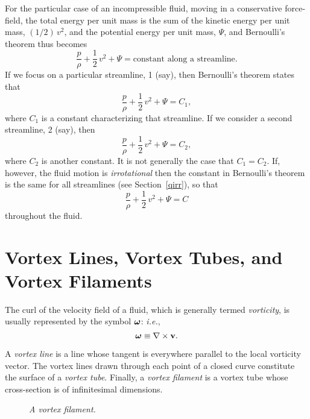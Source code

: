 For the particular case of an incompressible fluid, moving in a conservative force-field, the total energy per unit mass is the
sum of the kinetic energy per unit mass, $(1/2)\,v^2$, and the potential energy per unit mass, $\Psi$, and
Bernoulli's theorem thus becomes
\begin{equation}
\frac{p}{\rho} + \frac{1}{2}\,v^2 + \Psi = \mbox{constant along a streamline}.
\end{equation}
If we focus on a particular streamline, 1 (say), then Bernoulli's theorem states that
\begin{equation}
\frac{p}{\rho} + \frac{1}{2}\,v^2 + \Psi = C_1,
\end{equation}
where $C_1$ is a constant characterizing that streamline. If we consider a second streamline, 2 (say), then
\begin{equation}
\frac{p}{\rho} + \frac{1}{2}\,v^2 + \Psi = C_2,
\end{equation}
where $C_2$ is another constant. It is not generally the case that $C_1=C_2$. If, however, the fluid motion is
{\em irrotational}\/  then the constant in Bernoulli's theorem is the same for all streamlines (see Section~\ref{qirr}), so
that
\begin{equation}
\frac{p}{\rho} + \frac{1}{2}\,v^2 + \Psi = C
\end{equation}
throughout the fluid.

\section{Vortex Lines,   Vortex Tubes, and Vortex Filaments}
The curl of the velocity field of a fluid, which is generally termed  {\em vorticity},  is usually
represented by the symbol $\mbox{\boldmath$\omega$}$: {\em i.e.},
\begin{equation}
\mbox{\boldmath$\omega$} \equiv \nabla\times {\bf v}.
\end{equation}

A {\em vortex line}\/ is a line whose tangent is everywhere parallel to the local vorticity vector.
The vortex lines drawn through each point of a closed curve 
constitute the surface of a {\em vortex tube}. Finally, a
{\em vortex filament}\/ is a vortex tube whose cross-section is of infinitesimal dimensions. 

\begin{figure}
\epsfysize=2.5in
\centerline{}
\caption{\em A vortex filament.}\label{fvortex}
\end{figure}

